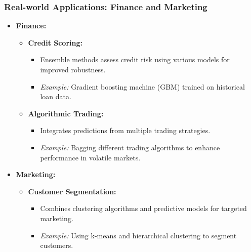 \documentclass[aspectratio=169]{beamer}
\begin{document}
\begin{frame}[fragile]
  \frametitle{Real-world Applications: Finance and Marketing}
  \begin{itemize}
    \item \textbf{Finance:}
      \begin{itemize}
        \item \textbf{Credit Scoring:} 
          \begin{itemize}
            \item Ensemble methods assess credit risk using various models for improved robustness.
            \item \textit{Example:} Gradient boosting machine (GBM) trained on historical loan data.
          \end{itemize}
        \item \textbf{Algorithmic Trading:} 
          \begin{itemize}
            \item Integrates predictions from multiple trading strategies.
            \item \textit{Example:} Bagging different trading algorithms to enhance performance in volatile markets.
          \end{itemize}
      \end{itemize}
    \item \textbf{Marketing:}
      \begin{itemize}
        \item \textbf{Customer Segmentation:}
          \begin{itemize}
            \item Combines clustering algorithms and predictive models for targeted marketing.
            \item \textit{Example:} Using k-means and hierarchical clustering to segment customers.
          \end{itemize}
      \end{itemize}
  \end{itemize}
\end{frame}
\end{document}
